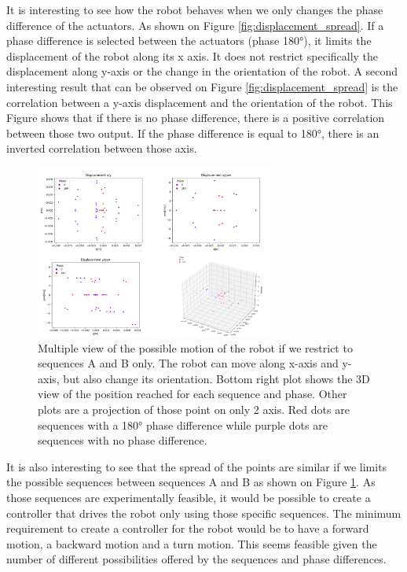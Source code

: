         It is interesting to see how the robot behaves when we only changes the phase difference of the actuators. As shown on Figure \ref{fig:displacement_spread}. If a phase difference is selected between the actuators (phase 180°), it limits the displacement of the robot along its x axis. It does not restrict specifically the displacement along y-axis or the change in the orientation of the robot. A second interesting result that can be observed on Figure \ref{fig:displacement_spread} is the correlation between a y-axis displacement and the orientation of the robot. This Figure shows that if there is no phase difference, there is a positive correlation between those two output. If the phase difference is equal to 180°, there is an inverted correlation between those axis. 
        
        \begin{figure}
            \centering
            \includegraphics[width=0.7\textwidth]{images/displacement_spread_AB.png}
            \caption{Multiple view of the possible motion of the robot if we restrict to sequences A and B only. The robot can move along x-axis and y-axis, but also change its orientation. Bottom right plot shows the 3D view of the position reached for each sequence and phase. Other plots are a projection of those point on only 2 axis. Red dots are sequences with a 180° phase difference while purple dots are sequences with no phase difference.}
            \label{fig:spreadAB}
        \end{figure}
        
        It is also interesting to see that the spread of the points are similar if we limits the possible sequences between sequences A and B as shown on Figure \ref{fig:spreadAB}. As those sequences are experimentally feasible, it would be possible to create a controller that drives the robot only using those specific sequences. The minimum requirement to create a controller for the robot would be to have a forward motion, a backward motion and a turn motion. This seems feasible given the number of different possibilities offered by the sequences and phase differences.
        
